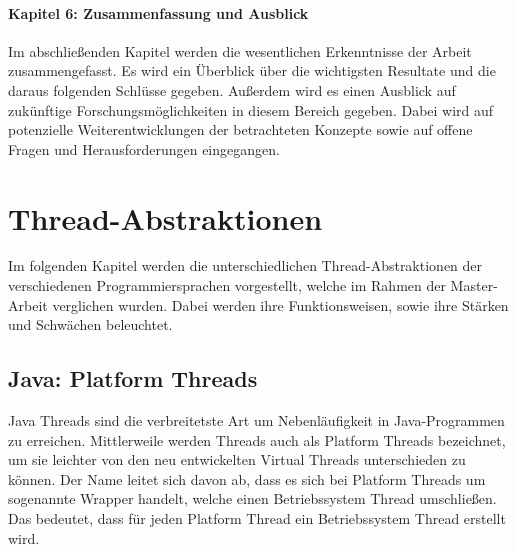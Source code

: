\documentclass[fontsize=12pt,paper=a4,twoside=semi,parskip=half-,headsepline,headinclude]{scrreprt}
\begin{document}
\subsubsection{Kapitel 6: Zusammenfassung und Ausblick}

Im abschließenden Kapitel werden die wesentlichen Erkenntnisse der Arbeit zusammengefasst. Es wird ein Überblick über die wichtigsten Resultate und die daraus folgenden Schlüsse gegeben. Außerdem wird es einen Ausblick auf zukünftige Forschungsmöglichkeiten in diesem Bereich gegeben. Dabei wird auf potenzielle Weiterentwicklungen der betrachteten Konzepte sowie auf offene Fragen und Herausforderungen eingegangen.

\chapter{Thread-Abstraktionen}

Im folgenden Kapitel werden die unterschiedlichen Thread-Abstraktionen der verschiedenen Programmiersprachen vorgestellt, welche im Rahmen der Master-Arbeit verglichen wurden. Dabei werden ihre Funktionsweisen, sowie ihre Stärken und Schwächen beleuchtet.

\section{Java: Platform Threads}

Java Threads sind die verbreitetste Art um Nebenläufigkeit in Java-Programmen zu erreichen. Mittlerweile werden Threads auch als Platform Threads bezeichnet, um sie leichter von den neu entwickelten Virtual Threads unterschieden zu können. Der Name leitet sich davon ab, dass es sich bei Platform Threads um sogenannte Wrapper handelt, welche einen Betriebssystem Thread umschließen. Das bedeutet, dass für jeden Platform Thread ein Betriebssystem Thread erstellt wird.
\end{document}
